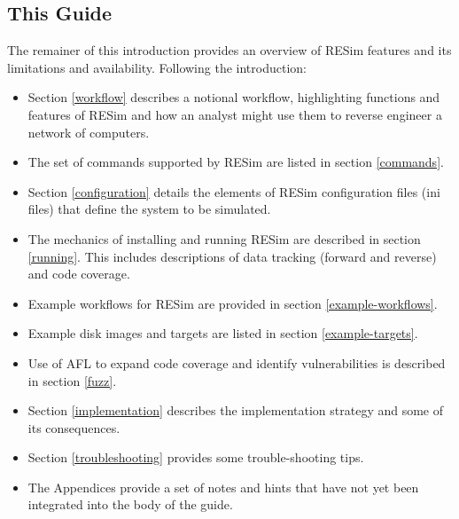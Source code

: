 \documentclass[titlepage]{article}
\begin{document}
\subsection{This Guide}
The remainer of this introduction provides an overview of RESim features and its limitations and availability.  Following the introduction:
\begin{itemize}
\item Section \ref{workflow} 
describes a notional workflow, highlighting functions and features of RESim and how an analyst might use them to reverse engineer a 
network of computers.  
\item The set of commands supported by RESim are listed in section \ref{commands}.  
\item Section \ref{configuration} details
the elements of RESim configuration files (ini files) that define the system to be simulated.  
\item The mechanics of installing and running 
RESim are described in section \ref{running}.  This includes descriptions of data tracking (forward and reverse) and code coverage. 
\item Example workflows for RESim are provided in section \ref{example-workflows}.  
\item Example disk images and targets are listed in section \ref{example-targets}.
\item Use of AFL to expand code coverage and identify vulnerabilities is described in section \ref{fuzz}.
\item Section \ref{implementation} describes the implementation strategy and some of its consequences.
\item Section \ref{troubleshooting} provides some trouble-shooting tips.
\item The Appendices provide a set of notes and hints that have not yet been integrated into the body of the guide.
\end{itemize}
\end{document}
